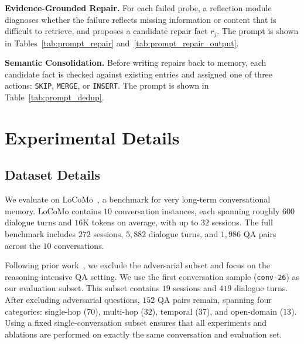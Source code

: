 \noindent\textbf{Evidence-Grounded Repair.}
For each failed probe, a reflection module diagnoses whether the failure reflects missing information or content that is difficult to retrieve, and proposes a candidate repair fact $r_j$.
The prompt is shown in Tables~\ref{tab:prompt_repair} and~\ref{tab:prompt_repair_output}.

\noindent\textbf{Semantic Consolidation.}
Before writing repairs back to memory, each candidate fact is checked against existing entries and assigned one of three actions: \texttt{SKIP}, \texttt{MERGE}, or \texttt{INSERT}.
The prompt is shown in Table~\ref{tab:prompt_dedup}.


\section{Experimental Details}
\subsection{Dataset Details}
\label{appendix:dataset_details}
We evaluate on LoCoMo~\cite{maharana2024evaluating}, a benchmark for very long-term conversational memory.
LoCoMo contains $10$ conversation instances, each spanning roughly $600$ dialogue turns and $16$K tokens on average, with up to $32$ sessions.
The full benchmark includes $272$ sessions, $5{,}882$ dialogue turns, and $1{,}986$ QA pairs across the $10$ conversations.

Following prior work~\cite{yan2025memory,fang2025lightmem}, we exclude the adversarial subset and focus on the reasoning-intensive QA setting.
We use the first conversation sample (\texttt{conv-26}) as our evaluation subset.
This subset contains $19$ sessions and $419$ dialogue turns.
After excluding adversarial questions, $152$ QA pairs remain, spanning four categories: single-hop ($70$), multi-hop ($32$), temporal ($37$), and open-domain ($13$).
Using a fixed single-conversation subset ensures that all experiments and ablations are performed on exactly the same conversation and evaluation set.

